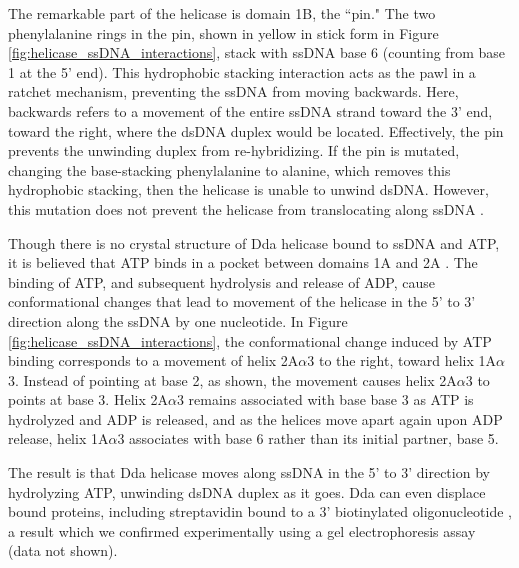 The remarkable part of the helicase is domain 1B, the ``pin."  The two phenylalanine rings in the pin, shown in yellow in stick form in Figure \ref{fig:helicase_ssDNA_interactions}, stack with ssDNA base 6 (counting from base 1 at the 5' end).  This hydrophobic stacking interaction acts as the pawl in a ratchet mechanism, preventing the ssDNA from moving backwards.  Here, backwards refers to a movement of the entire ssDNA strand toward the 3' end, toward the right, where the dsDNA duplex would be located.  Effectively, the pin prevents the unwinding duplex from re-hybridizing.  If the pin is mutated, changing the base-stacking phenylalanine to alanine, which removes this hydrophobic stacking, then the helicase is unable to unwind dsDNA.  However, this mutation does not prevent the helicase from translocating along ssDNA \citep{He2012}.

Though there is no crystal structure of Dda helicase bound to ssDNA and ATP, it is believed that ATP binds in a pocket between domains 1A and 2A \citep{He2012}.  The binding of ATP, and subsequent hydrolysis and release of ADP, cause conformational changes that lead to movement of the helicase in the 5' to 3' direction along the ssDNA by one nucleotide.  In Figure \ref{fig:helicase_ssDNA_interactions}, the conformational change induced by ATP binding corresponds to a movement of helix 2A$\alpha$3 to the right, toward helix 1A$\alpha$3.  Instead of pointing at base 2, as shown, the movement causes helix 2A$\alpha$3 to points at base 3.  Helix 2A$\alpha$3 remains associated with base base 3 as ATP is hydrolyzed and ADP is released, and as the helices move apart again upon ADP release, helix 1A$\alpha$3 associates with base 6 rather than its initial partner, base 5.

The result is that Dda helicase moves along ssDNA in the 5' to 3' direction by hydrolyzing ATP, unwinding dsDNA duplex as it goes.  Dda can even displace bound proteins, including streptavidin bound to a 3' biotinylated oligonucleotide \citep{Morris1999}, a result which we confirmed experimentally using a gel electrophoresis assay (data not shown). %
